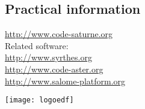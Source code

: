 \documentclass[a4paper,11pt]{article}
\begin{document}
\begin{multicols*}{3}
\section*{Practical information}

\url{http://www.code-saturne.org}\\

Related software:\\
\url{http://www.syrthes.org}\\
\url{http://www.code-aster.org}\\
\url{http://www.salome-platform.org}

\begin{center}
  \texttt{[image: logoedf]}
\end{center}

\end{multicols*}
\end{document}
